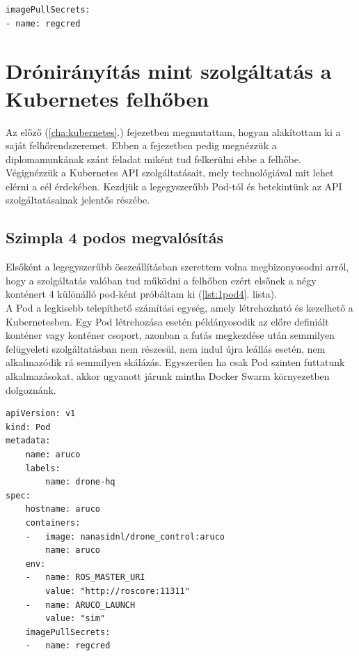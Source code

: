 \begin{minipage}{\linewidth}
\begin{lstlisting}[caption={K8S API secret definiálása a konténerekhez},label={lst:dhsec}]
imagePullSecrets:
- name: regcred
\end{lstlisting}
\end{minipage}


\chapter{Drónirányítás mint szolgáltatás a Kubernetes felhőben}

Az előző (\ref{cha:kubernetes}.) fejezetben megmutattam, hogyan alakítottam ki a saját felhőrendszeremet. Ebben a fejezetben pedig megnézzük a diplomamunkának szánt feladat miként tud felkerülni ebbe a felhőbe. Végignézzük a Kubernetes API szolgáltatásait, mely technológiával mit lehet elérni a cél érdekében. Kezdjük a legegyszerűbb Pod-tól és betekintünk az API szolgáltatásainak jelentős részébe.

\section{Szimpla 4 podos megvalósítás}
Elsőként a legegyszerűbb összeállításban szerettem volna megbizonyosodni arról, hogy a szolgáltatás valóban tud működni a felhőben ezért elsőnek a négy konténert 4 különálló pod-ként próbáltam ki (\ref{lst:1pod4}. lista). \\

\noindent
A Pod a legkisebb telepíthető számítási egység, amely létrehozható és kezelhető a Kubernetesben. Egy Pod létrehozása esetén példányosodik az előre definiált konténer vagy konténer csoport, azonban a futás megkezdése után semmilyen felügyeleti szolgáltatásban nem részesül, nem indul újra leállás esetén, nem alkalmazódik rá semmilyen skálázás. Egyszerűen ha csak Pod szinten futtatunk alkalmazásokat, akkor ugyanott járunk mintha Docker Swarm környezetben dolgoznánk. \\
\begin{minipage}{\linewidth}
\begin{lstlisting}[caption={Példa egy Pod-ra a négyből},label={lst:1pod4}]
apiVersion: v1
kind: Pod
metadata:
	name: aruco
	labels:
		name: drone-hq
spec:
	hostname: aruco
	containers:
	- 	image: nanasidnl/drone_control:aruco
		name: aruco
	env:
	- 	name: ROS_MASTER_URI
		value: "http://roscore:11311"
	- 	name: ARUCO_LAUNCH
		value: "sim"
	imagePullSecrets:
	-	name: regcred
\end{lstlisting}
\end{minipage}


